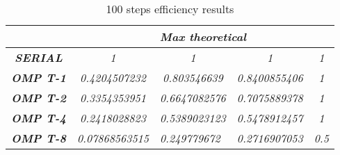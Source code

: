 \begin{table}
    \centering
    \begin{tabular}{|c|c|c|c|c|} 
    \hline
                                                    & \multicolumn{4}{c|}{\textbf{\textit{Max theoretical}}}                                                                                                                    \\ 
    \hline
    \textbf{\textit{SERIAL}}                        & \textit{1}                                  & \textit{1}                                & \textit{1}                                 & \textit{1}                         \\ 
    \hline
    \textbf{\textit{OMP T-1}}                       & \textit{0.4204507232}                       & \textit{0.803546639}                      & \textit{0.8400855406}                      & \textit{1}                         \\ 
    \hline
    \textbf{\textit{OMP T-2}}                       & \textit{0.3354353951}                       & \textit{0.6647082576}                     & \textit{0.7075889378}                      & \textit{1}                         \\ 
    \hline
    \textbf{\textit{OMP T-4}}                       & \textit{0.2418028823}                       & \textit{0.5389023123}                     & \textit{0.5478912457}                      & \textit{1}                         \\ 
    \hline
    \multicolumn{1}{|l|}{\textbf{\textit{OMP T-8}}} & \multicolumn{1}{l|}{\textit{0.07868563515}} & \multicolumn{1}{l|}{\textit{0.249779672}} & \multicolumn{1}{l|}{\textit{0.2716907053}} & \multicolumn{1}{l|}{\textit{0.5}}  \\
    \hline
    \end{tabular}
    \caption{100 steps efficiency results}
\end{table}